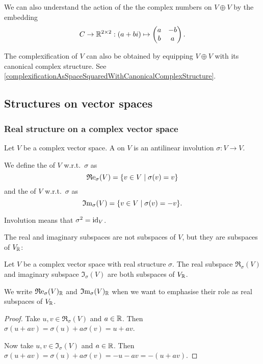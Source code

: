 We can also understand the action of the the complex numbers on $V\oplus V$ by the embedding
\[ C\to \mathbb{R}^{2\times 2}: (a+bi) \mapsto \begin{pmatrix}
a & -b \\
b & a
\end{pmatrix}. \]

The complexification of $V$ can also be obtained by equipping $V\oplus V$ with its canonical complex structure. See \ref{complexificationAsSpaceSquaredWithCanonicalComplexStructure}.

\subsection{Structures on vector spaces}
\subsubsection{Real structure on a complex vector space}
\begin{definition}
Let $V$ be a complex vector space. A  on $V$ is an antilinear involution $\sigma: V\to V$.

We define the  of $V$ w.r.t.\ $\sigma$ as
\[ \Re_\sigma(V) = \setbuilder{v\in V}{\sigma(v) = v} \]
and the  of $V$ w.r.t.\ $\sigma$ as
\[ \Im_\sigma(V) = \setbuilder{v\in V}{\sigma(v) = -v}. \]
\end{definition}
Involution means that $\sigma^2 = \operatorname{id}_V$.

The real and imaginary subspaces are not subspaces of $V$, but they are subspaces of $V_{\mathbb{R}}$:
\begin{lemma}
Let $V$ be a complex vector space with real structure $\sigma$. The real subspace $\Re_\sigma(V)$ and imaginary subspace $\Im_\sigma(V)$ are both subspaces of $V_{\mathbb{R}}$.
\end{lemma}
We write $\operatorname{\mathfrak{R}e}_\sigma(V)_{\mathbb{R}}$ and $\operatorname{\mathfrak{I}m}_\sigma(V)_{\mathbb{R}}$ when we want to emphasise their role as real subspaces of $V_{\mathbb{R}}$.
\begin{proof}
Take $u,v \in \Re_\sigma(V)$ and $a\in \mathbb{R}$. Then $\sigma(u+av) = \sigma(u)+ a\sigma(v) = u+av$.

Now take $u,v \in \Im_\sigma(V)$ and $a\in \mathbb{R}$. Then $\sigma(u+av) = \sigma(u)+ a\sigma(v) = -u-av = -(u+av)$.
\end{proof}


